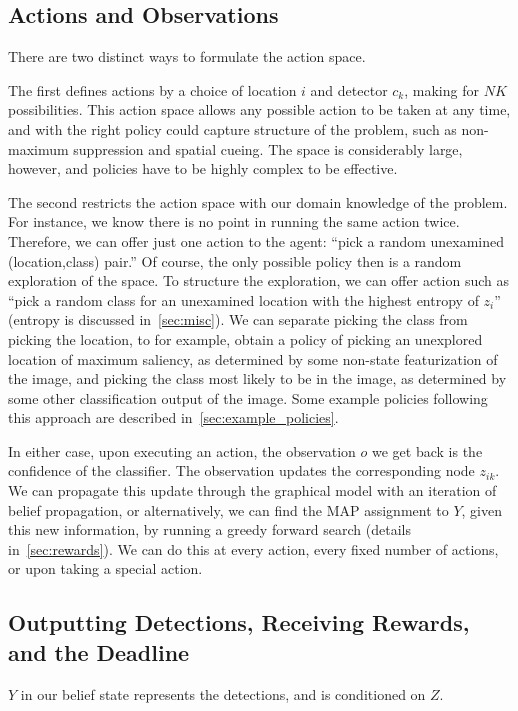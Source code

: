 \subsection{Actions and Observations} \label{sec:actions}
There are two distinct ways to formulate the action space.

The first defines actions by a choice of location $i$ and detector $c_{k}$, making for $NK$ possibilities.
This action space allows any possible action to be taken at any time, and with the right policy could capture structure of the problem, such as non-maximum suppression and spatial cueing.
The space is considerably large, however, and policies have to be highly complex to be effective.

The second restricts the action space with our domain knowledge of the problem.
For instance, we know there is no point in running the same action twice.
Therefore, we can offer just one action to the agent: ``pick a random unexamined (location,class) pair.''
Of course, the only possible policy then is a random exploration of the space.
To structure the exploration, we can offer action such as ``pick a random class for an unexamined location with the highest entropy of $z_{i}$'' (entropy is discussed in~\autoref{sec:misc}).
We can separate picking the class from picking the location, to for example, obtain a policy of picking an unexplored location of maximum saliency, as determined by some non-state featurization of the image, and picking the class most likely to be in the image, as determined by some other classification output of the image.
Some example policies following this approach are described in~\autoref{sec:example_policies}.

In either case, upon executing an action, the observation $o$ we get back is the confidence of the classifier.
The observation updates the corresponding node $z_{ik}$.
We can propagate this update through the graphical model with an iteration of belief propagation, or alternatively, we can find the MAP assignment to $Y$, given this new information, by running a greedy forward search (details in~\autoref{sec:rewards}).
We can do this at every action, every fixed number of actions, or upon taking a special action.

\subsection{Outputting Detections, Receiving Rewards, and the Deadline} \label{sec:rewards}
$Y$ in our belief state represents the detections, and is conditioned on $Z$.

